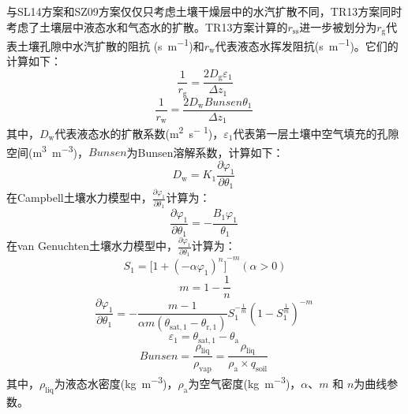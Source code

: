 \begin{enumerate}
    与SL14方案和SZ09方案仅仅只考虑土壤干燥层中的水汽扩散不同，TR13方案同时考虑了土壤层中液态水和气态水的扩散。TR13方案计算的\(r_{\mathrm{ss}}\)进一步被划分为\(r_{\mathrm{g}}\)代表土壤孔隙中水汽扩散的阻抗 (\unit{s.m^{-1}})和\(r_{\mathrm{w}}\)代表液态水挥发阻抗(\unit{s.m^{-1}})。它们的计算如下：
    \begin{equation}
      \frac{1}{r_{\mathrm{\mathrm{g}}}} = \frac{2D_{\mathrm{g}}\varepsilon_{1}}
      {\Delta z_{1}}
    \end{equation}
    \begin{equation}
      \frac{1}{r_{\mathrm{w}}} = \frac{2D_{\mathrm{w}}Bunsen\theta_{1}}
      {\Delta z_{1}}\
    \end{equation}
    其中，\(D_{\mathrm{w}}\)代表液态水的扩散系数(\unit{m^{2}.s^{- 1}})，\(\varepsilon_{1}\)代表第一层土壤中空气填充的孔隙空间(\unit{m^{3}.m^{-3}})，\(Bunsen\)为Bunsen溶解系数，计算如下：
    \begin{equation}
      D_{\mathrm{w}} = K_{1}\frac{\partial\varphi_{1}}{\partial\theta_{1}}\
    \end{equation}
    在Campbell土壤水力模型中，\(\frac{\partial\varphi_{1}}{\partial\theta_{1}}\)计算为：
    \begin{equation}
      \frac{\partial\varphi_{1}}{\partial\theta_{1}} = - \frac{B_{1}\varphi_{1}}{\theta_{1}}\
    \end{equation}
    在van Genuchten土壤水力模型中，\(\frac{\partial\varphi_{1}}{\partial\theta_{1}}\)计算为：
    \begin{equation}
      S_{1} = {\lbrack 1 + ( - \alpha\varphi_{1})^{n}\rbrack}^{- m}(\alpha > 0)
    \end{equation}
    \begin{equation}
      m = 1-\frac{1}{n}
    \end{equation}
    \begin{equation}
      \frac{\partial\varphi_{1}}{\partial\theta_{1}} = - \frac{m - 1}{\alpha m\left( \theta_{\mathrm{sat,1}} - \theta_{\mathrm{r,1}} \right)}S_{1}^{- \frac{1}{m}}\left( 1 - S_{1}^{\frac{1}{m}} \right)^{- m}\
    \end{equation}
    \begin{equation}
      \varepsilon_{1} = \theta_{\mathrm{sat,1}} - \theta_{\mathrm{a}}\
    \end{equation}
    \begin{equation}
      Bunsen = \frac{\rho_{\mathrm{liq}}}{\rho_{\mathrm{vap}}} = \frac{\rho_{\mathrm{liq}}}{\rho_{\mathrm{a}} \times q_{\mathrm{soil}}}\
    \end{equation}
    其中，\(\rho_{\mathrm{liq}}\)为液态水密度(\unit{{kg}.m^{-3}})，\(\rho_{\mathrm{a}}\)为空气密度(\unit{{kg}.m^{-3}})，$\alpha$、$m$ 和 $n$为曲线参数。


\end{enumerate}
